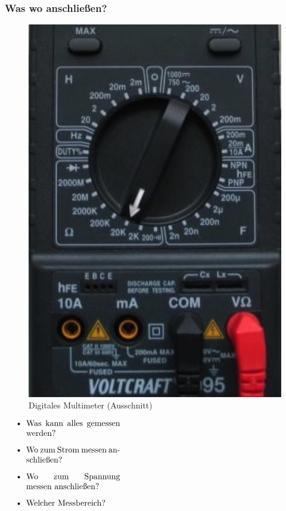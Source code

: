 \begin{frame}
  \frametitle{Was wo anschließen?}
  \begin{minipage}{0.5\textwidth}
    \begin{figure}
      \includegraphics[width=1\textwidth,height=.75\textheight,keepaspectratio]{e02/digitalmultimeterMess.jpg}
      \caption{Digitales Multimeter (Ausschnitt) \cite{multimeter}}
	  \label{fig_multimeter_crop}
    \end{figure}
  \end{minipage}
$   \begin{minipage}{0.4\textwidth}
    \begin{itemize}
      \item Was kann alles gemessen werden?
      \item Wo zum Strom messen anschließen?
      \item Wo zum Spannung messen anschließen?
      \item Welcher Messbereich?
    \end{itemize}
  \end{minipage} $
\end{frame}


